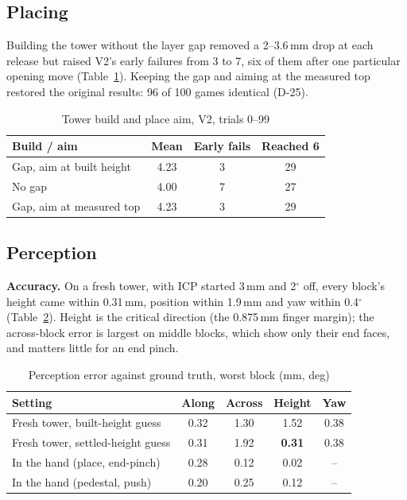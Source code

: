 \documentclass[conference]{IEEEtran}
\begin{document}
\subsection{Placing}\label{sec:res-place}
Building the tower without the layer gap removed a 2--3.6\,mm drop at each release but raised V2's early failures from 3
to 7, six of them after one particular opening move (Table~\ref{tab:gap}). Keeping the gap and aiming at the measured
top restored the original results: 96 of 100 games identical (D-25).

\begin{table}[t]
\caption{Tower build and place aim, V2, trials 0--99}\label{tab:gap}
\centering
\begin{tabular}{lccc}
\toprule
Build / aim & Mean & Early fails & Reached 6 \\
\midrule
Gap, aim at built height & 4.23 & 3 & 29 \\
No gap & 4.00 & 7 & 27 \\
Gap, aim at measured top & 4.23 & 3 & 29 \\
\bottomrule
\end{tabular}
\end{table}

\subsection{Perception}\label{sec:res-perc}
\textbf{Accuracy.} On a fresh tower, with ICP started 3\,mm and 2$^\circ$ off, every block's height came within 0.31\,mm,
position within 1.9\,mm and yaw within 0.4$^\circ$ (Table~\ref{tab:perc}). Height is the critical direction (the
0.875\,mm finger margin); the across-block error is largest on middle blocks, which show only their end faces, and
matters little for an end pinch.

\begin{table}[t]
\caption{Perception error against ground truth, worst block (mm, deg)}\label{tab:perc}
\centering
\begin{tabular}{lcccc}
\toprule
Setting & Along & Across & Height & Yaw \\
\midrule
Fresh tower, built-height guess & 0.32 & 1.30 & 1.52 & 0.38 \\
Fresh tower, settled-height guess & 0.31 & 1.92 & \textbf{0.31} & 0.38 \\
In the hand (place, end-pinch) & 0.28 & 0.12 & 0.02 & -- \\
In the hand (pedestal, push) & 0.20 & 0.25 & 0.12 & -- \\
\bottomrule
\end{tabular}
\end{table}
\end{document}
